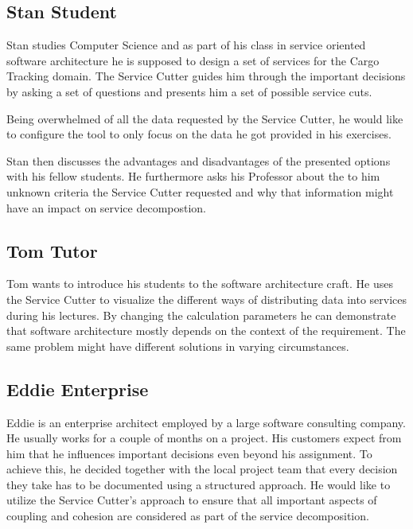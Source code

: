 \subsection{Stan Student}

Stan studies Computer Science and as part of his class in service oriented software architecture he is supposed to design a set of services for the Cargo Tracking\cite{dddGithub} domain. The Service Cutter guides him through the important decisions by asking a set of questions and presents him a set of possible service cuts. 

Being overwhelmed of all the data requested by the Service Cutter, he would like to configure the tool to only focus on the data he got provided in his exercises. 

Stan then discusses the advantages and disadvantages of the presented options with his fellow students. He furthermore asks his Professor about the to him unknown criteria the Service Cutter requested and why that information might have an impact on service decompostion. 


\subsection{Tom Tutor}

Tom wants to introduce his students to the software architecture craft. He uses the Service Cutter to visualize the different ways of distributing data into services during his lectures. By changing the calculation parameters he can demonstrate that software architecture mostly depends on the context of the requirement. The same problem might have different solutions in varying circumstances.

\subsection{Eddie Enterprise}

Eddie is an enterprise architect employed by a large software consulting company. He usually works for a couple of months on a project. His customers expect from him that he influences important decisions even beyond his assignment. To achieve this, he decided together with the local project team that every decision they take has to be documented using a structured approach. He would like to utilize the Service Cutter's approach to ensure that all important aspects of coupling and cohesion are considered as part of the service decomposition.
